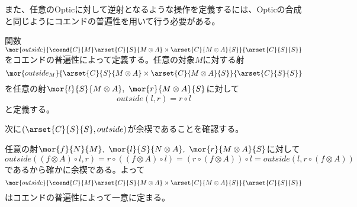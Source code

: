 \documentclass[uplatex,dvipdfmx]{jsarticle}
\begin{document}
  また、任意のOpticに対して逆射となるような操作を定義するには、Opticの合成と同じようにコエンドの普遍性を用いて行う必要がある。
  \begin{define}[outside関数]
    関数$\mor{outside}{\coend{C}{M}\arset{C}{S}{M\otimes A}\times\arset{C}{M\otimes A}{S}}{\arset{C}{S}{S}}$をコエンドの普遍性によって定義する。任意の対象$M$に対する射
    \[\mor{outside_M}{\arset{C}{S}{M\otimes A}\times\arset{C}{M\otimes A}{S}}{\arset{C}{S}{S}}\]を任意の射$\mor{l}{S}{M\otimes A},\ \mor{r}{M\otimes A}{S}$に対して\[outside(l,r)=r\circ l\]と定義する。

    次に$(\arset{C}{S}{S},outside)$が余楔であることを確認する。
    \begin{center}
    \end{center}
    任意の射$\mor{f}{N}{M},\ \mor{l}{S}{N\otimes A},\ \mor{r}{M\otimes A}{S}$に対して\[outside((f\otimes A)\circ l,r) = r\circ ((f\otimes A)\circ l)=(r\circ (f\otimes A))\circ l=outside(l,r\circ (f\otimes A))\]であるから確かに余楔である。よって\[\mor{outside}{\coend{C}{M}\arset{C}{S}{M\otimes A}\times\arset{C}{M\otimes A}{S}}{\arset{C}{S}{S}}\]はコエンドの普遍性によって一意に定まる。
  \end{define}
  
\end{document}
